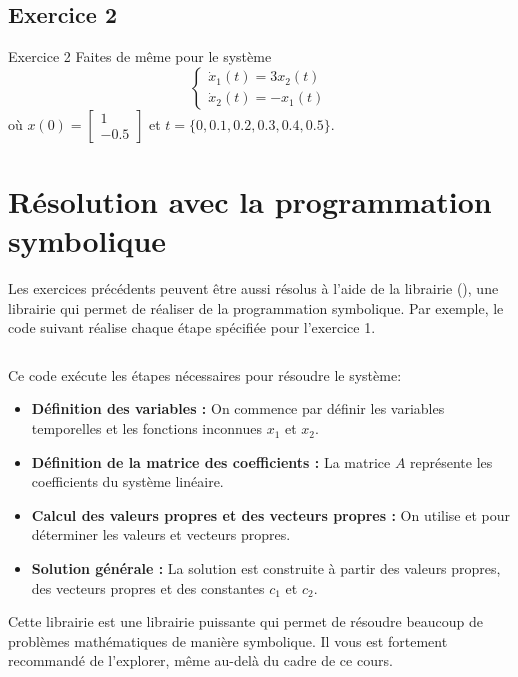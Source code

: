         \subsection{Exercice 2}
            \begin{exercise}{Exercice 2}
                Faites de même pour le système
                \begin{equation}
                    \begin{cases}
                        \dot{x}_1(t)=3 x_2(t)\\
                        \dot{x}_2(t)=-x_1(t)
                    \end{cases}
                \end{equation}
                où $x(0)=\begin{bmatrix} 1 \\ -0.5 \end{bmatrix}$ et $t=\{0, 0.1, 0.2, 0.3, 0.4, 0.5\}$.
            \end{exercise}
            
    \section{Résolution avec la programmation symbolique}
        Les exercices précédents peuvent être aussi résolus à l'aide de la librairie  (\cite{Sympy2017}), une librairie qui permet de réaliser de la programmation symbolique. Par exemple, le code suivant réalise chaque étape spécifiée pour l'exercice 1.
        \inputminted{python}{codes/sympy.py}
        Ce code  exécute les étapes nécessaires pour résoudre le système:
        \begin{itemize}
            \item \textbf{Définition des variables :} On commence par définir les variables temporelles et les fonctions inconnues $x_1$ et $x_2$.
            \item \textbf{Définition de la matrice des coefficients :} La matrice $A$ représente les coefficients du système linéaire.
            \item \textbf{Calcul des valeurs propres et des vecteurs propres :} On utilise  et  pour déterminer les valeurs et vecteurs propres.
            \item \textbf{Solution générale :} La solution est construite à partir des valeurs propres, des vecteurs propres et des constantes $c_1$ et $c_2$.
        \end{itemize}
        Cette librairie est une librairie puissante qui permet de résoudre beaucoup de problèmes mathématiques de manière symbolique. Il vous est fortement recommandé de l'explorer, même au-delà du cadre de ce cours.